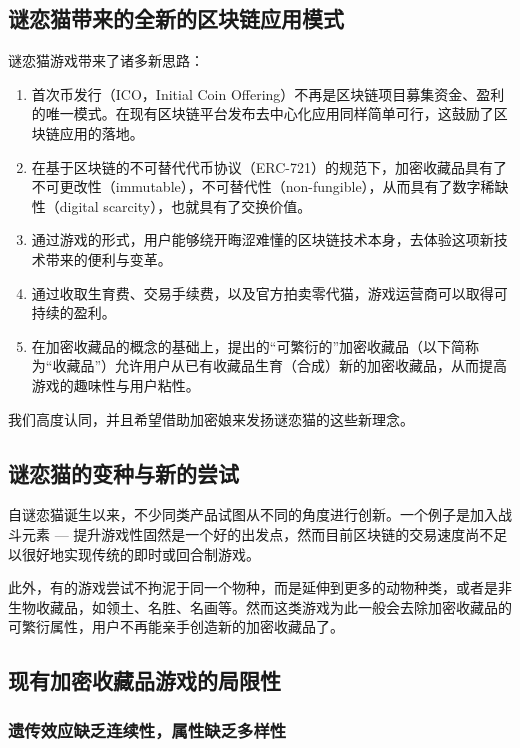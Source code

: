 \documentclass[a4paper]{article}
\begin{document}
\subsection{谜恋猫带来的全新的区块链应用模式}

谜恋猫游戏带来了诸多新思路：

\begin{enumerate}
\item 首次币发行（ICO，Initial Coin Offering）不再是区块链项目募集资金、盈利的唯一模式。在现有区块链平台发布去中心化应用同样简单可行，这鼓励了区块链应用的落地。
\item 在基于区块链的不可替代代币协议（ERC-721）的规范下，加密收藏品具有了不可更改性（immutable），不可替代性（non-fungible），从而具有了数字稀缺性（digital scarcity），也就具有了交换价值。
\item 通过游戏的形式，用户能够绕开晦涩难懂的区块链技术本身，去体验这项新技术带来的便利与变革。
\item 通过收取生育费、交易手续费，以及官方拍卖零代猫，游戏运营商可以取得可持续的盈利。
\item 在加密收藏品的概念的基础上，提出的``可繁衍的''加密收藏品（以下简称为``收藏品''）允许用户从已有收藏品生育（合成）新的加密收藏品，从而提高游戏的趣味性与用户粘性。
\end{enumerate}

我们高度认同，并且希望借助加密娘来发扬谜恋猫的这些新理念。

\subsection{谜恋猫的变种与新的尝试}

自谜恋猫诞生以来，不少同类产品试图从不同的角度进行创新。一个例子是加入战斗元素\cite{cryptofighters,fishbank,cryptomons,etheremon} --- 提升游戏性固然是一个好的出发点，然而目前区块链的交易速度尚不足以很好地实现传统的即时或回合制游戏。

此外，有的游戏尝试不拘泥于同一个物种，而是延伸到更多的动物种类\cite{cryptopets,etheremon}，或者是非生物收藏品，如领土\cite{cryptocountries}、名胜\cite{cryptolandmarks}、名画\cite{cryptoarts}等。然而这类游戏为此一般会去除加密收藏品的可繁衍属性，用户不再能亲手创造新的加密收藏品了。

\subsection{现有加密收藏品游戏的局限性}
\subsubsection{遗传效应缺乏连续性，属性缺乏多样性}
\end{document}
